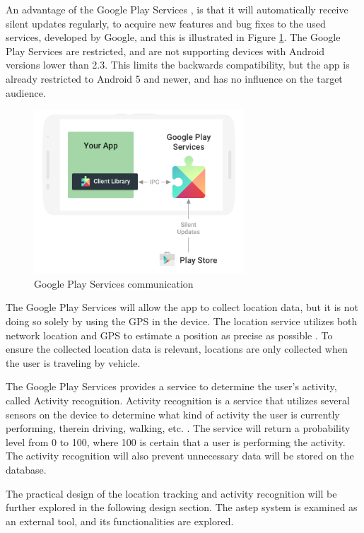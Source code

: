 An advantage of the Google Play Services \cite{GapiOverview}, is that it will automatically receive silent updates regularly, to acquire new features and bug fixes to the used services, developed by Google, and this is illustrated in Figure \ref{fig:gapifigure}.
The Google Play Services are restricted, and are not supporting devices with Android versions lower than 2.3. 
This limits the backwards compatibility, but the app is already restricted to Android 5 and newer, and has no influence on the target audience.

\begin{figure}[h]
	\centering
	\includegraphics[width=0.7\textwidth]{figures/play-services-diagram.png}
	\caption{Google Play Services communication\cite{GapiFigure}}
	\label{fig:gapifigure}
\end{figure}

The Google Play Services will allow the app to collect location data, but it is not doing so solely by using the GPS in the device. 
The location service utilizes both network location and GPS to estimate a position as precise as possible \cite{GapiLocation}. 
To ensure the collected location data is relevant, locations are only collected when the user is traveling by vehicle.

The Google Play Services provides a service to determine the user's activity, called Activity recognition. 
Activity recognition is a service that utilizes several sensors on the device to determine what kind of activity the user is currently performing, therein driving, walking, etc. \cite{activitysensor}.
The service will return a probability level from 0 to 100, where 100 is certain that a user is performing the activity.
The activity recognition will also prevent unnecessary data will be stored on the database. 

The practical design of the location tracking and activity recognition will be further explored in the following design section.
The \gls{astep} system is examined as an external tool, and its functionalities are explored.
